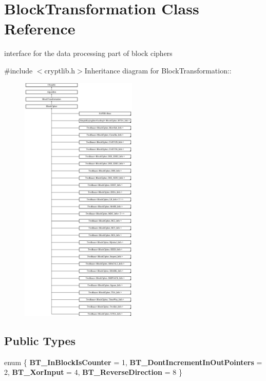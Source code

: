 \hypertarget{class_block_transformation}{
\section{BlockTransformation Class Reference}
\label{class_block_transformation}
}


interface for the data processing part of block ciphers  


{\ttfamily \#include $<$cryptlib.h$>$}Inheritance diagram for BlockTransformation::\begin{figure}[H]
\begin{center}
\leavevmode
\includegraphics[height=12cm]{class_block_transformation}
\end{center}
\end{figure}
\subsection*{Public Types}
\begin{DoxyCompactItemize}
\item 
enum \{ {\bfseries BT\_\-InBlockIsCounter} = 1, 
{\bfseries BT\_\-DontIncrementInOutPointers} = 2, 
{\bfseries BT\_\-XorInput} = 4, 
{\bfseries BT\_\-ReverseDirection} = 8
 \}
\end{DoxyCompactItemize}
